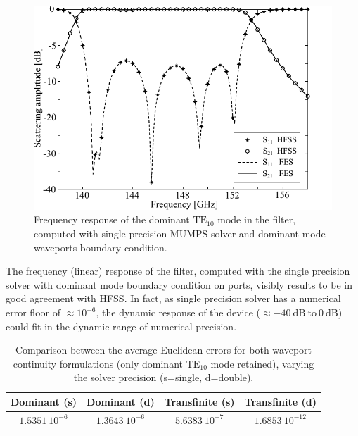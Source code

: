 \begin{figure}[ht!]
\centering
\includegraphics[width=14cm]{Bilat3Dresponse}
\caption{Frequency response of the dominant $\mathrm{TE}_{10}$ mode in the filter, computed with single precision MUMPS solver and dominant mode waveports boundary condition.}
\label{fig:Bilat3Dresponse}
\end{figure}

The frequency (linear) response of the filter, computed with the single precision solver with dominant mode boundary condition on ports, visibly results to be in good agreement with HFSS. In fact, as single precision solver has a numerical error floor of $\approx 10^{-6}$, the dynamic response of the device ($\approx -40~\mathrm{dB} ~\mathrm{to}~0~\mathrm{dB}$) could fit in the dynamic range of numerical precision.

\begin{table}[h!]
\begin{center}
\begin{tabular}{|c|c|c|c|}
\hline 
Dominant (s) & Dominant (d) & Transfinite (s) & Transfinite (d) \\ 
\hline
\hline
$   1.5351 \ 10^{-6}$ & $1.3643 \ 10^{-6}$ & $5.6383 \ 10^{-7}$ & $1.6853 \ 10^{-12}$ \\ 
\hline 
\end{tabular}
\end{center}
\caption{Comparison between the average Euclidean errors for both waveport continuity formulations (only dominant $\mathrm{TE}_{10}$ mode retained), varying the solver precision (s=single, d=double).}
\label{tab:Bilatprecision}
\end{table}

